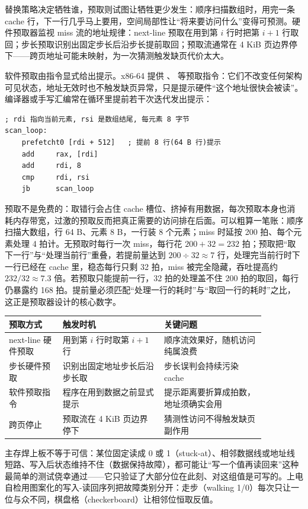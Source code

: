 替换策略决定牺牲谁，预取则试图让牺牲更少发生：顺序扫描数组时，用完一条 cache 行，下一行几乎马上要用，空间局部性让“将来要访问什么”变得可预测。硬件预取器监视 miss 流的地址规律：next-line 预取在用到第 $i$ 行时把第 $i+1$ 行取回；步长预取识别出固定步长后沿步长提前取回；预取流通常在 4 KiB 页边界停下——跨页地址可能未映射，为一次猜测触发缺页代价太大。

软件预取由指令显式给出提示。x86-64 提供 、 等预取指令：它们不改变任何架构可见状态，地址无效时也不触发缺页异常，只是提示硬件“这个地址很快会被读”。编译器或手写汇编常在循环里提前若干次迭代发出提示：

\begin{lstlisting}
; rdi 指向当前元素, rsi 是数组结尾, 每元素 8 字节
scan_loop:
    prefetcht0 [rdi + 512]   ; 提前 8 行(64 B 行)提示
    add     rax, [rdi]
    add     rdi, 8
    cmp     rdi, rsi
    jb      scan_loop
\end{lstlisting}

预取不是免费的：取错行会占住 cache 槽位、挤掉有用数据，每次预取本身也消耗内存带宽，过激的预取反而把真正需要的访问排在后面。可以粗算一笔账：顺序扫描大数组，行 64 B、元素 8 B，一行装 8 个元素；miss 时延按 200 拍、每个元素处理 4 拍计。无预取时每行一次 miss，每行花 $200+32=232$ 拍；预取把“取下一行”与“处理当前行”重叠，若提前量达到 $200\div 32\approx 7$ 行，处理完当前行时下一行已经在 cache 里，稳态每行只剩 32 拍，miss 被完全隐藏，吞吐提高约 $232/32\approx 7.3$ 倍。若预取只能提前一行，32 拍的处理盖不住 200 拍的取回，每行仍暴露约 168 拍。提前量必须匹配“处理一行的耗时”与“取回一行的耗时”之比，这正是预取器设计的核心数字。

\begin{longtable}{L{0.18\linewidth}L{0.34\linewidth}L{0.34\linewidth}}
\toprule
预取方式 & 触发时机 & 关键问题 \\
\midrule
next-line 硬件预取 & 用到第 $i$ 行时取第 $i+1$ 行 & 顺序流效果好，随机访问纯属浪费 \\\tablerowrule
步长硬件预取 & 识别出固定地址步长后沿步长取 & 步长误判会持续污染 cache \\\tablerowrule
软件预取指令 & 程序在用到数据之前显式提示 & 提示距离要折算成拍数，地址须确实会用 \\\tablerowrule
跨页停止 & 预取流在 4 KiB 页边界停下 & 猜测性访问不得触发缺页副作用 \\
\bottomrule
\end{longtable}

主存焊上板不等于可信：某位固定读成 0 或 1（stuck-at）、相邻数据线或地址线短路、写入后状态维持不住（数据保持故障），都可能让“写一个值再读回来”这种最简单的测试侥幸通过——它只验证了大部分位在此刻、对这组值是可写的。上电自检用图案化的写入-读回序列把故障类别分开：走步（walking 1/0）每次只让一位与众不同，棋盘格（checkerboard）让相邻位恒取反值。

